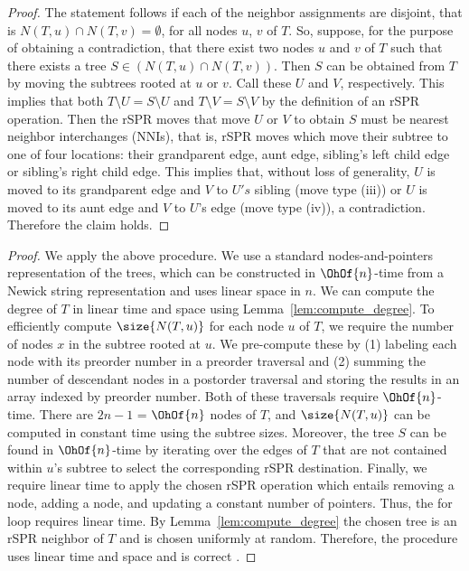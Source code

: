 \documentclass[10pt,twoside,leqno,twocolumn]{article}
\newcommand{\cuttable}[2][]{%
    \ifthenelse{\equal{#1}{}}%
		{}%
		{#1}%
}
\begin{document}
\computedegree*
\begin{proof}
	The statement follows if each of the neighbor assignments are disjoint, that is $N(T,u) \cap N(T,v) = \emptyset$, for all nodes $u$, $v$ of $T$.
	So, suppose, for the purpose of obtaining a contradiction, that there exist two nodes $u$ and $v$ of $T$ such that there exists a tree $S \in (N(T,u) \cap N(T,v))$.
	Then $S$ can be obtained from $T$ by moving the subtrees rooted at $u$ or $v$.
	Call these $U$ and $V$, respectively.
	This implies that both $T \setminus U = S \setminus U$ and $T \setminus V = S \setminus V$ by the definition of an rSPR operation.
	Then the rSPR moves that move $U$ or $V$ to obtain $S$ must be nearest neighbor interchanges (NNIs), that is, rSPR moves which move their subtree to one of four locations: their grandparent edge, aunt edge, sibling's left child edge or sibling's right child edge.
	This implies that, without loss of generality, $U$ is moved to its grandparent edge and $V$ to $U's$ sibling (move type (iii)) or $U$ is moved to its aunt edge and $V$ to $U$'s edge (move type (iv)), a contradiction.
	Therefore the claim holds.
\end{proof}

\selectrandomneighbor*
\begin{proof}
	We apply the above procedure.
	We use a standard nodes-and-pointers representation of the trees, which can be constructed in $\OhOf{n}$-time from a Newick string representation and uses linear space in $n$.
	We can compute the degree of $T$ in linear time and space using Lemma~\ref{lem:compute_degree}.
	To efficiently compute $\size{N(T,u)}$ for each node $u$ of $T$, we require the number of nodes $x$ in the subtree rooted at $u$.
	We pre-compute these by (1) labeling each node with its preorder number in a preorder traversal and (2) summing the number of descendant nodes in a postorder traversal and storing the results in an array indexed by preorder number.
	Both of these traversals require $\OhOf{n}$-time.
	There are $2n-1$ = $\OhOf{n}$ nodes of $T$, and $\size{N(T,u)}$ can be computed in constant time using the subtree sizes.
	Moreover, the tree $S$ can be found in $\OhOf{n}$-time by iterating over the edges of $T$ that are not contained within $u$'s subtree to select the corresponding rSPR destination.
	Finally, we require linear time to apply the chosen rSPR operation which entails removing a node, adding a node, and updating a constant number of pointers.
	Thus, the for loop requires linear time.
	By Lemma~\ref{lem:compute_degree} the chosen tree is an rSPR neighbor of $T$ and is chosen uniformly at random.
	Therefore, the procedure uses linear time and space and \cuttable[is correct]{selects an rSPR neighbor of $T$ uniformly at random}.
\end{proof}
\end{document}
